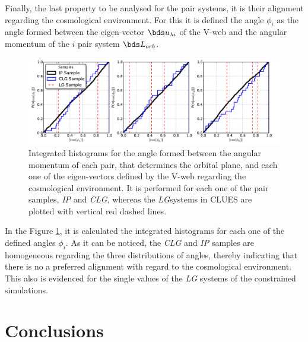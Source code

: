 Finally, the last property to be analysed  for the pair systems, it is 
their alignment regarding the cosmological environment. For this it is 
defined the angle $\phi_i$ as the angle formed between the eigen-vector 
$\bds u_{\lambda i}$ of the V-web and the angular momentum of the $i$ 
pair system $\bds L_{orb}$.


\begin{figure}[htbp]
	\centering
	\includegraphics[trim = 0mm 0mm 5mm 0mm, clip, width=1.0\textwidth]
	{./figures/4_results/CLG_Alineation.pdf}
	
	\caption{\small{Integrated histograms for the angle formed between
	the angular momentum of each pair, that determines the orbital plane,
	and each one of the eigen-vectors defined by the V-web regarding the
	cosmological environment. It is performed for each one of the pair 
	samples, \textit{IP} and \textit{CLG}, whereas the \textit{LG}systems 
	in CLUES are plotted with vertical red dashed lines.}}
	\label{fig:CLG_Alineation}
\end{figure}
	

In the Figure \ref{fig:CLG_Alineation}, it is calculated the integrated
histograms for each one of the defined angles $\phi_i$. As it can be 
noticed, the \textit{CLG} and \textit{IP} samples are homogeneous 
regarding the three distributions of angles, thereby indicating that there
is no a preferred alignment with regard to the cosmological environment.
This also is evidenced for the single values of the \textit{LG} systems of
the constrained simulations.






	
\section{Conclusions}
\label{sec:Conclusions}



